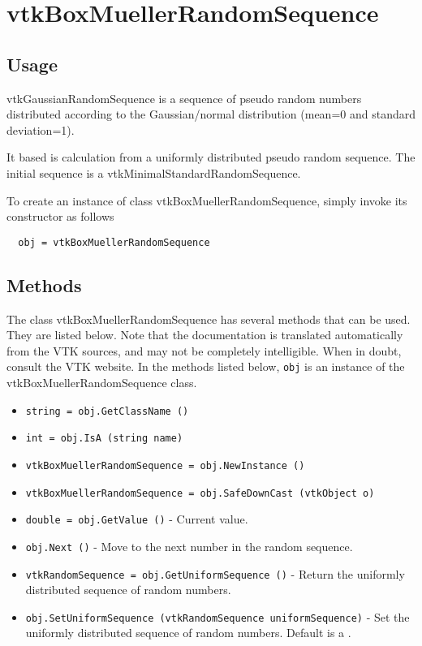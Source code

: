 \section{vtkBoxMuellerRandomSequence}

\subsection{Usage}

 vtkGaussianRandomSequence is a sequence of pseudo random numbers
 distributed according to the Gaussian/normal distribution (mean=0 and
 standard deviation=1).

 It based is calculation from a uniformly distributed pseudo random sequence.
 The initial sequence is a vtkMinimalStandardRandomSequence.

To create an instance of class vtkBoxMuellerRandomSequence, simply
invoke its constructor as follows
\begin{verbatim}
  obj = vtkBoxMuellerRandomSequence
\end{verbatim}
\subsection{Methods}

The class vtkBoxMuellerRandomSequence has several methods that can be used.
  They are listed below.
Note that the documentation is translated automatically from the VTK sources,
and may not be completely intelligible.  When in doubt, consult the VTK website.
In the methods listed below, \verb|obj| is an instance of the vtkBoxMuellerRandomSequence class.
\begin{itemize}
\item  \verb|string = obj.GetClassName ()|

\item  \verb|int = obj.IsA (string name)|

\item  \verb|vtkBoxMuellerRandomSequence = obj.NewInstance ()|

\item  \verb|vtkBoxMuellerRandomSequence = obj.SafeDownCast (vtkObject o)|

\item  \verb|double = obj.GetValue ()| -  Current value.

\item  \verb|obj.Next ()| -  Move to the next number in the random sequence.

\item  \verb|vtkRandomSequence = obj.GetUniformSequence ()| -  Return the uniformly distributed sequence of random numbers.

\item  \verb|obj.SetUniformSequence (vtkRandomSequence uniformSequence)| -  Set the uniformly distributed sequence of random numbers.
 Default is a .

\end{itemize}

